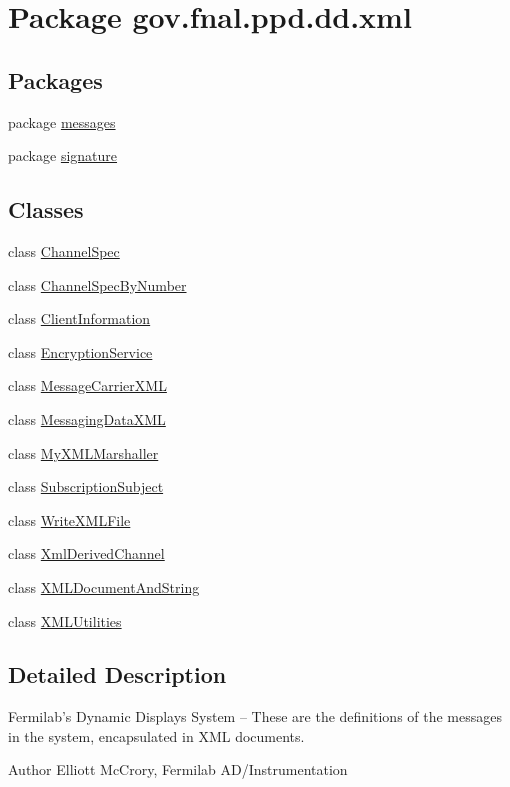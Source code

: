 \hypertarget{namespacegov_1_1fnal_1_1ppd_1_1dd_1_1xml}{\section{Package gov.\-fnal.\-ppd.\-dd.\-xml}
\label{namespacegov_1_1fnal_1_1ppd_1_1dd_1_1xml}
}
\subsection*{Packages}
\begin{DoxyCompactItemize}
\item 
package \hyperlink{namespacegov_1_1fnal_1_1ppd_1_1dd_1_1xml_1_1messages}{messages}
\item 
package \hyperlink{namespacegov_1_1fnal_1_1ppd_1_1dd_1_1xml_1_1signature}{signature}
\end{DoxyCompactItemize}
\subsection*{Classes}
\begin{DoxyCompactItemize}
\item 
class \hyperlink{classgov_1_1fnal_1_1ppd_1_1dd_1_1xml_1_1ChannelSpec}{Channel\-Spec}
\item 
class \hyperlink{classgov_1_1fnal_1_1ppd_1_1dd_1_1xml_1_1ChannelSpecByNumber}{Channel\-Spec\-By\-Number}
\item 
class \hyperlink{classgov_1_1fnal_1_1ppd_1_1dd_1_1xml_1_1ClientInformation}{Client\-Information}
\item 
class \hyperlink{classgov_1_1fnal_1_1ppd_1_1dd_1_1xml_1_1EncryptionService}{Encryption\-Service}
\item 
class \hyperlink{classgov_1_1fnal_1_1ppd_1_1dd_1_1xml_1_1MessageCarrierXML}{Message\-Carrier\-X\-M\-L}
\item 
class \hyperlink{classgov_1_1fnal_1_1ppd_1_1dd_1_1xml_1_1MessagingDataXML}{Messaging\-Data\-X\-M\-L}
\item 
class \hyperlink{classgov_1_1fnal_1_1ppd_1_1dd_1_1xml_1_1MyXMLMarshaller}{My\-X\-M\-L\-Marshaller}
\item 
class \hyperlink{classgov_1_1fnal_1_1ppd_1_1dd_1_1xml_1_1SubscriptionSubject}{Subscription\-Subject}
\item 
class \hyperlink{classgov_1_1fnal_1_1ppd_1_1dd_1_1xml_1_1WriteXMLFile}{Write\-X\-M\-L\-File}
\item 
class \hyperlink{classgov_1_1fnal_1_1ppd_1_1dd_1_1xml_1_1XmlDerivedChannel}{Xml\-Derived\-Channel}
\item 
class \hyperlink{classgov_1_1fnal_1_1ppd_1_1dd_1_1xml_1_1XMLDocumentAndString}{X\-M\-L\-Document\-And\-String}
\item 
class \hyperlink{classgov_1_1fnal_1_1ppd_1_1dd_1_1xml_1_1XMLUtilities}{X\-M\-L\-Utilities}
\end{DoxyCompactItemize}


\subsection{Detailed Description}
Fermilab's Dynamic Displays System -- These are the definitions of the messages in the system, encapsulated in X\-M\-L documents. 

\begin{DoxyAuthor}{Author}
Elliott Mc\-Crory, Fermilab A\-D/\-Instrumentation 
\end{DoxyAuthor}
